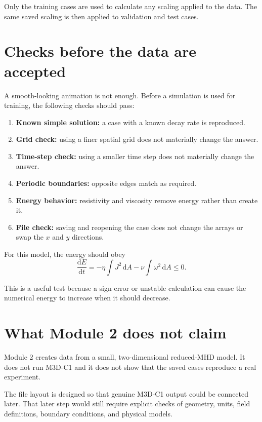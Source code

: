 \documentclass[11pt]{article}
\begin{document}
Only the training cases are used to calculate any scaling applied to the data. The same saved scaling is then applied to validation and test cases.

\section{Checks before the data are accepted}

A smooth-looking animation is not enough. Before a simulation is used for training, the following checks should pass:

\begin{enumerate}[leftmargin=2em]
\item \textbf{Known simple solution:} a case with a known decay rate is reproduced.
\item \textbf{Grid check:} using a finer spatial grid does not materially change the answer.
\item \textbf{Time-step check:} using a smaller time step does not materially change the answer.
\item \textbf{Periodic boundaries:} opposite edges match as required.
\item \textbf{Energy behavior:} resistivity and viscosity remove energy rather than create it.
\item \textbf{File check:} saving and reopening the case does not change the arrays or swap the $x$ and $y$ directions.
\end{enumerate}

For this model, the energy should obey
\begin{equation}
\frac{\mathrm d E}{\mathrm d t}
=-\eta\int J^2\,\mathrm dA
-\nu\int \omega^2\,\mathrm dA
\le 0.
\end{equation}

This is a useful test because a sign error or unstable calculation can cause the numerical energy to increase when it should decrease.

\section{What Module 2 does not claim}

Module 2 creates data from a small, two-dimensional reduced-MHD model. It does not run M3D-C1 and it does not show that the saved cases reproduce a real experiment.

The file layout is designed so that genuine M3D-C1 output could be connected later. That later step would still require explicit checks of geometry, units, field definitions, boundary conditions, and physical models.
\end{document}
